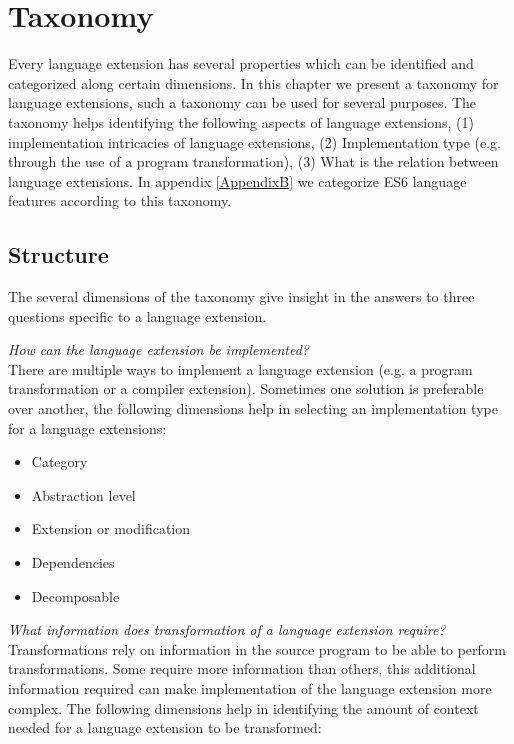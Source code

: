 
\chapter{Taxonomy} %

\label{Chapter4}

 \label{taxonomy}

Every language extension has several properties which can be identified and categorized along certain dimensions. In this chapter we present a taxonomy for language extensions, such a taxonomy can be used for several purposes. The taxonomy helps identifying the following aspects of language extensions, (1) implementation intricacies of language extensions, (2) Implementation type (e.g. through the use of a program transformation), (3) What is the relation between language extensions. In appendix \ref{AppendixB} we categorize ES6 language features according to this taxonomy.

\section{Structure}

The several dimensions of the taxonomy give insight in the answers to three questions specific to a language extension.

\textit{How can the language extension be implemented?}\\
There are multiple ways to implement a language extension (e.g. a program transformation or a compiler extension). Sometimes one solution is preferable over another, the following dimensions help in selecting an implementation type for a language extensions:

\begin{itemize}
	\item Category
	\item Abstraction level
	\item Extension or modification
	\item Dependencies
	\item Decomposable
\end{itemize}

\textit{What information does transformation of a language extension require?}\\
Transformations rely on information in the source program to be able to perform transformations. Some require more information than others, this additional information required can make implementation of the language extension more complex. The following dimensions help in identifying the amount of context needed for a language extension to be transformed:

